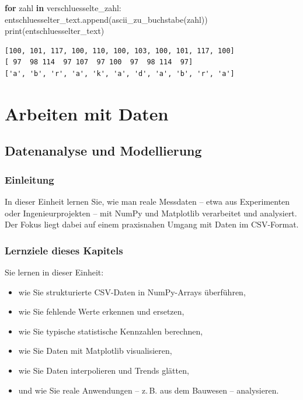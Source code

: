 \documentclass[
  letterpaper,
  DIV=11,
  numbers=noendperiod]{scrreprt}
\newenvironment{Shaded}{\begin{snugshade}}{\end{snugshade}}
\newcommand{\BuiltInTok}[1]{\textcolor[rgb]{0.00,0.23,0.31}{#1}}
\newcommand{\ControlFlowTok}[1]{\textcolor[rgb]{0.00,0.23,0.31}{\textbf{#1}}}
\newcommand{\KeywordTok}[1]{\textcolor[rgb]{0.00,0.23,0.31}{\textbf{#1}}}
\newcommand{\NormalTok}[1]{\textcolor[rgb]{0.00,0.23,0.31}{#1}}
\providecommand{\tightlist}{%
  \setlength{\itemsep}{0pt}\setlength{\parskip}{0pt}}\usepackage{longtable,booktabs,array}
\begin{document}
\begin{tcolorbox}
\begin{tcolorbox}
\begin{Shaded}
\begin{Highlighting}[]
\ControlFlowTok{for}\NormalTok{ zahl }\KeywordTok{in}\NormalTok{ verschluesselte\_zahl:    }
\NormalTok{    entschluesselter\_text.append(ascii\_zu\_buchstabe(zahl))}
\BuiltInTok{print}\NormalTok{(entschluesselter\_text)}
\end{Highlighting}
\end{Shaded}

\begin{verbatim}
[100, 101, 117, 100, 110, 100, 103, 100, 101, 117, 100]
[ 97  98 114  97 107  97 100  97  98 114  97]
['a', 'b', 'r', 'a', 'k', 'a', 'd', 'a', 'b', 'r', 'a']
\end{verbatim}

\end{tcolorbox}

\end{tcolorbox}

\part{Arbeiten mit Daten}

\chapter{Datenanalyse und
Modellierung}\label{datenanalyse-und-modellierung}

\section{Einleitung}\label{einleitung-1}

In dieser Einheit lernen Sie, wie man reale Messdaten -- etwa aus
Experimenten oder Ingenieurprojekten -- mit NumPy und Matplotlib
verarbeitet und analysiert. Der Fokus liegt dabei auf einem praxisnahen
Umgang mit Daten im CSV-Format.

\section{Lernziele dieses Kapitels}\label{lernziele-dieses-kapitels-5}

Sie lernen in dieser Einheit:

\begin{itemize}
\tightlist
\item
  wie Sie strukturierte CSV-Daten in NumPy-Arrays überführen,
\item
  wie Sie fehlende Werte erkennen und ersetzen,
\item
  wie Sie typische statistische Kennzahlen berechnen,
\item
  wie Sie Daten mit Matplotlib visualisieren,
\item
  wie Sie Daten interpolieren und Trends glätten,
\item
  und wie Sie reale Anwendungen -- z.\,B. aus dem Bauwesen --
  analysieren.
\end{itemize}
\end{document}
